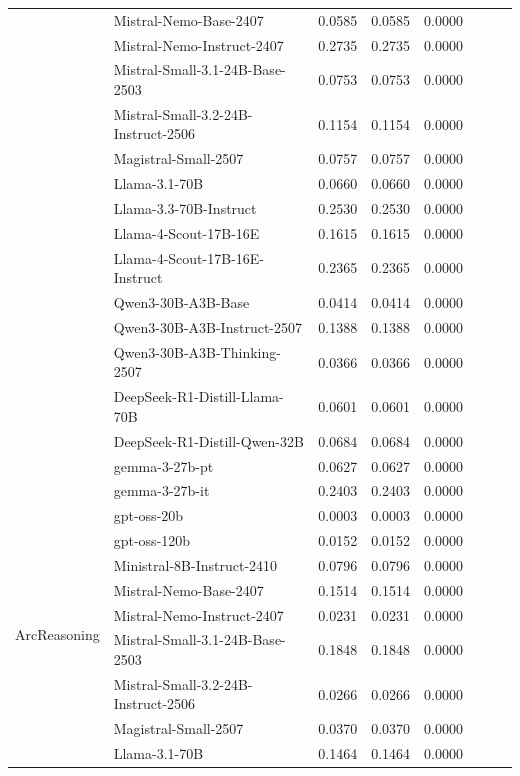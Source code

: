 \begin{table}[h]
{\begin{tabular}{l|lcccc|cc}
        & Mistral-Nemo-Base-2407 & 0.0585 & 0.0585 & 0.0000 \\
        & Mistral-Nemo-Instruct-2407 & 0.2735 & 0.2735 & 0.0000 \\
        & Mistral-Small-3.1-24B-Base-2503 & 0.0753 & 0.0753 & 0.0000 \\
        & Mistral-Small-3.2-24B-Instruct-2506 & 0.1154 & 0.1154 & 0.0000 \\
        & Magistral-Small-2507 & 0.0757 & 0.0757 & 0.0000 \\
        & Llama-3.1-70B & 0.0660 & 0.0660 & 0.0000 \\
        & Llama-3.3-70B-Instruct & 0.2530 & 0.2530 & 0.0000 \\
        & Llama-4-Scout-17B-16E & 0.1615 & 0.1615 & 0.0000 \\
        & Llama-4-Scout-17B-16E-Instruct & 0.2365 & 0.2365 & 0.0000 \\
        & Qwen3-30B-A3B-Base & 0.0414 & 0.0414 & 0.0000 \\
        & Qwen3-30B-A3B-Instruct-2507 & 0.1388 & 0.1388 & 0.0000 \\
        & Qwen3-30B-A3B-Thinking-2507 & 0.0366 & 0.0366 & 0.0000 \\
        & DeepSeek-R1-Distill-Llama-70B & 0.0601 & 0.0601 & 0.0000 \\
        & DeepSeek-R1-Distill-Qwen-32B & 0.0684 & 0.0684 & 0.0000 \\
        & gemma-3-27b-pt & 0.0627 & 0.0627 & 0.0000 \\
        & gemma-3-27b-it & 0.2403 & 0.2403 & 0.0000 \\
        \midrule
        \multirow{19}{*}{ArcReasoning} & gpt-oss-20b & 0.0003 & 0.0003 & 0.0000 \\
        & gpt-oss-120b & 0.0152 & 0.0152 & 0.0000 \\
        & Ministral-8B-Instruct-2410 & 0.0796 & 0.0796 & 0.0000 \\
        & Mistral-Nemo-Base-2407 & 0.1514 & 0.1514 & 0.0000 \\
        & Mistral-Nemo-Instruct-2407 & 0.0231 & 0.0231 & 0.0000 \\
        & Mistral-Small-3.1-24B-Base-2503 & 0.1848 & 0.1848 & 0.0000 \\
        & Mistral-Small-3.2-24B-Instruct-2506 & 0.0266 & 0.0266 & 0.0000 \\
        & Magistral-Small-2507 & 0.0370 & 0.0370 & 0.0000 \\
        & Llama-3.1-70B & 0.1464 & 0.1464 & 0.0000 \\

\end{tabular}}
\end{table}
